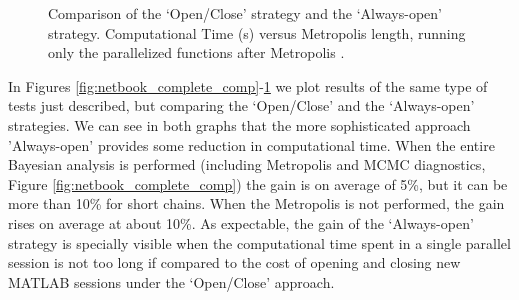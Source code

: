 \documentclass[12pt,a4paper,pdftex]{article}
\begin{document}
\begin{figure}
\begin{centering}
  \epsfxsize=300pt 
  \caption{Comparison of the `Open/Close' strategy and the `Always-open' strategy. Computational Time (s) versus Metropolis length, running only the parallelized functions after Metropolis \citep{Lubik2003}.}\label{fig:netbook_partial_comp}
\end{centering}
\end{figure}
In Figures \ref{fig:netbook_complete_comp}-\ref{fig:netbook_partial_comp} we plot results of the same type of tests just described, but comparing the `Open/Close' and the `Always-open' strategies. We can see in both graphs that the more sophisticated approach 'Always-open' provides some reduction in computational time. When the entire Bayesian analysis is performed (including Metropolis and MCMC diagnostics, Figure \ref{fig:netbook_complete_comp}) the gain is on average of 5\%, but it can be more than 10\% for short chains. When the Metropolis is not performed, the gain rises on average at about 10\%. As expectable, the gain of the `Always-open' strategy is specially visible when the computational time spent in a single parallel session is not too long if compared to the cost of opening and closing new MATLAB sessions under the `Open/Close' approach.
\end{document}
